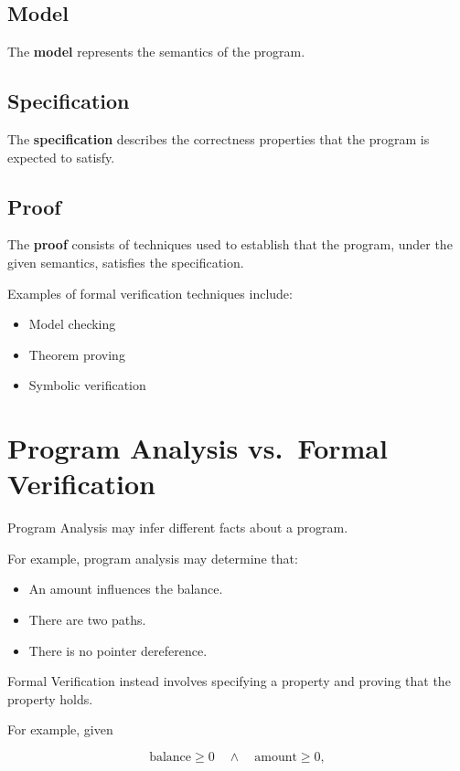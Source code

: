 \subsection{Model}

The \textbf{model} represents the semantics of the program.

\subsection{Specification}

The \textbf{specification} describes the correctness properties that
the program is expected to satisfy.

\subsection{Proof}

The \textbf{proof} consists of techniques used to establish that the
program, under the given semantics, satisfies the specification.

Examples of formal verification techniques include:

\begin{itemize}
    \item Model checking
    \item Theorem proving
    \item Symbolic verification
\end{itemize}


\section{Program Analysis vs.\ Formal Verification}

Program Analysis may infer different facts about a program.

For example, program analysis may determine that:

\begin{itemize}
    \item An amount influences the balance.
    \item There are two paths.
    \item There is no pointer dereference.
\end{itemize}

Formal Verification instead involves specifying a property and proving
that the property holds.

For example, given

\[
\text{balance} \geq 0
\quad\land\quad
\text{amount} \geq 0,
\]

